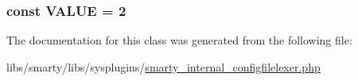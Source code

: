 \subsubsection[{V\+A\+L\+U\+E}]{\setlength{\rightskip}{0pt plus 5cm}const V\+A\+L\+U\+E = 2}\label{class_smarty___internal___configfilelexer_a3ec449ec46c5758fbc92b311afa9381e}


The documentation for this class was generated from the following file\+:\begin{DoxyCompactItemize}
\item 
libs/smarty/libs/sysplugins/\hyperlink{smarty__internal__configfilelexer_8php}{smarty\+\_\+internal\+\_\+configfilelexer.\+php}\end{DoxyCompactItemize}
